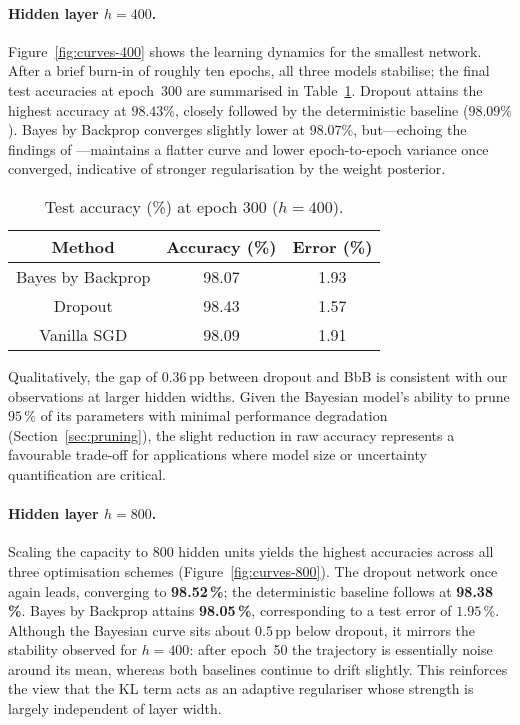 \documentclass{article}
\begin{document}
\paragraph{Hidden layer $h=400$.}
Figure~\ref{fig:curves-400} shows the learning dynamics for the smallest network.  
After a brief burn-in of roughly ten epochs, all three models stabilise; the final test accuracies at epoch~300 are summarised in Table~\ref{tab:acc-400}.
Dropout attains the highest accuracy at $\mathbf{98.43\%}$, closely followed by the deterministic baseline ($98.09\%$).  
Bayes by Backprop converges slightly lower at $\mathbf{98.07\%}$, but—echoing the findings of \citet{blundell2015weight}—maintains a flatter curve and lower epoch-to-epoch variance once converged, indicative of stronger regularisation by the weight posterior.

\begin{table}[h]
\centering
\caption{Test accuracy (\%) at epoch 300 ($h=400$).}
\label{tab:acc-400}
\begin{tabular}{ccc}
\toprule
Method & Accuracy (\%) & Error (\%) \\
\midrule
Bayes by Backprop & 98.07 & 1.93 \\
Dropout           & 98.43 & 1.57 \\
Vanilla SGD       & 98.09 & 1.91 \\
\bottomrule
\end{tabular}
\end{table}

Qualitatively, the gap of $0.36$\,pp between dropout and BbB is consistent with our observations at larger hidden widths.  
Given the Bayesian model’s ability to prune $95\,\%$ of its parameters with minimal performance degradation (Section~\ref{sec:pruning}), the slight reduction in raw accuracy represents a favourable trade-off for applications where model size or uncertainty quantification are critical.

\paragraph{Hidden layer $h=800$.}
Scaling the capacity to $800$ hidden units yields the highest accuracies across all three optimisation schemes (Figure~\ref{fig:curves-800}).  
The dropout network once again leads, converging to \textbf{98.52\,\%}; the deterministic baseline follows at \textbf{98.38\,\%}.  
Bayes by Backprop attains \textbf{98.05\,\%}, corresponding to a test error of $1.95\,\%$.  
Although the Bayesian curve sits about $0.5$\,pp below dropout, it mirrors the stability observed for $h=400$: after epoch~50 the trajectory is essentially noise around its mean, whereas both baselines continue to drift slightly.  This reinforces the view that the KL term acts as an adaptive regulariser whose strength is largely independent of layer width.
\end{document}
